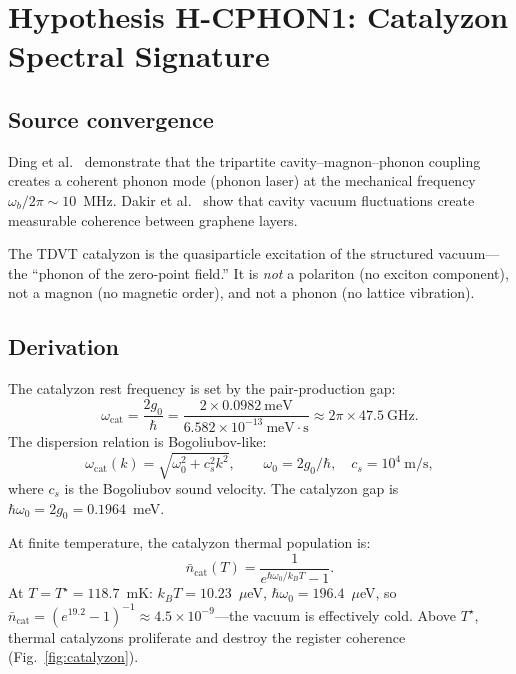 \documentclass[11pt,letterpaper]{article}
\newcommand{\gzero}{g_0}
\newcommand{\Tstar}{T^{\!\star}}
\begin{document}
\section{Hypothesis H-CPHON1: Catalyzon Spectral Signature}\label{sec:hcphon1}

\subsection{Source convergence}
Ding et al.~\cite{Ding2019} demonstrate that the tripartite cavity--magnon--phonon coupling creates a coherent phonon mode (phonon laser) at the mechanical frequency $\omega_b/2\pi \sim 10$~MHz.  Dakir et al.~\cite{Dakir2026} show that cavity vacuum fluctuations create measurable coherence between graphene layers.

The TDVT catalyzon is the quasiparticle excitation of the structured vacuum---the ``phonon of the zero-point field.''  It is \emph{not} a polariton (no exciton component), not a magnon (no magnetic order), and not a phonon (no lattice vibration).

\subsection{Derivation}
The catalyzon rest frequency is set by the pair-production gap:
\begin{equation}\label{eq:omega_cat}
  \omega_{\mathrm{cat}} = \frac{2\gzero}{\hbar} = \frac{2 \times 0.0982~\text{meV}}{6.582 \times 10^{-13}~\text{meV}\cdot\text{s}} \approx 2\pi \times 47.5~\text{GHz}.
\end{equation}
The dispersion relation is Bogoliubov-like:
\begin{equation}\label{eq:cat_disp}
  \omega_{\mathrm{cat}}(k) = \sqrt{\omega_0^2 + c_s^2 k^2}, \qquad \omega_0 = 2\gzero/\hbar, \quad c_s = 10^4~\text{m/s},
\end{equation}
where $c_s$ is the Bogoliubov sound velocity.  The catalyzon gap is $\hbar\omega_0 = 2\gzero = 0.1964$~meV.

At finite temperature, the catalyzon thermal population is:
\begin{equation}
  \bar{n}_{\mathrm{cat}}(T) = \frac{1}{e^{\hbar\omega_0/k_BT} - 1}.
\end{equation}
At $T = \Tstar = 118.7$~mK: $k_BT = 10.23$~$\mu$eV, $\hbar\omega_0 = 196.4$~$\mu$eV, so $\bar{n}_{\mathrm{cat}} = (e^{19.2} - 1)^{-1} \approx 4.5 \times 10^{-9}$---the vacuum is effectively cold.  Above $\Tstar$, thermal catalyzons proliferate and destroy the register coherence (Fig.~\ref{fig:catalyzon}).
\end{document}
